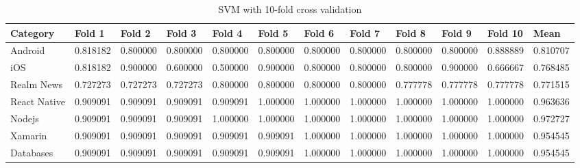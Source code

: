 \documentclass[letterpaper,11pt]{article}
\newcommand*{\srcPath}{../src}%
\begin{document}
\begin{table}[h]
\centering
\begin{adjustbox}{max width=\linewidth}
\begin{tabular}{ | l | l | l | l | l | l | l | l | l | l | l | l |}
\hline
\textbf{Category} & \textbf{Fold 1} & \textbf{Fold 2} & \textbf{Fold 3} & \textbf{Fold 4} & \textbf{Fold 5} & \textbf{Fold 6} & \textbf{Fold 7} & \textbf{Fold 8} & \textbf{Fold 9} & \textbf{Fold 10} & \textbf{Mean} \\
\hline
Android & 0.818182 & 0.800000 & 0.800000 & 0.800000 & 0.800000 & 0.800000 & 0.800000 & 0.800000 & 0.800000 & 0.888889 & 0.810707 \\ 
iOS & 0.818182 & 0.900000 & 0.600000 & 0.500000 & 0.900000 & 0.800000 & 0.800000 & 0.800000 & 0.900000 & 0.666667 & 0.768485 \\ 
Realm News & 0.727273 & 0.727273 & 0.727273 & 0.800000 & 0.800000 & 0.800000 & 0.800000 & 0.777778 & 0.777778 & 0.777778 & 0.771515 \\ 
React Native & 0.909091 & 0.909091 & 0.909091 & 0.909091 & 1.000000 & 1.000000 & 1.000000 & 1.000000 & 1.000000 & 1.000000 & 0.963636 \\ 
Nodejs & 0.909091 & 0.909091 & 0.909091 & 1.000000 & 1.000000 & 1.000000 & 1.000000 & 1.000000 & 1.000000 & 1.000000 & 0.972727 \\ 
Xamarin & 0.909091 & 0.909091 & 0.909091 & 0.909091 & 0.909091 & 1.000000 & 1.000000 & 1.000000 & 1.000000 & 1.000000 & 0.954545 \\ 
Databases & 0.909091 & 0.909091 & 0.909091 & 0.909091 & 0.909091 & 1.000000 & 1.000000 & 1.000000 & 1.000000 & 1.000000 & 0.954545 \\ 
\hline
\end{tabular}
\end{adjustbox}
\caption{SVM with 10-fold cross validation}
\label{table:q2cross}
\end{table}

\clearpage




\end{document}
